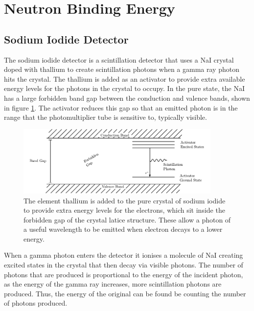 
\section{Neutron Binding Energy} %
\label{sec:neutron_binding_energy}

\subsection{Sodium Iodide Detector} %
\label{ssub:sodium_iodide_detector}
The sodium iodide detector is a scintillation detector that uses a NaI crystal doped with thallium to create scintillation photons when a gamma ray photon hits the crystal. The thallium is added as an activator to provide extra available energy levels for the photons in the crystal to occupy. In the pure state, the NaI has a large forbidden band gap between the conduction and valence bands, shown in figure \ref{fig:thaliumactivator}. The activator reduces this gap so that an emitted photon is in the range that the photomultiplier tube is sensitive to, typically visible.
\begin{figure}[ht]
	\centering
	\includegraphics[width=0.9\textwidth]{NaIbands.pdf}
	\caption{The element thallium is added to the pure crystal of sodium iodide to provide extra energy levels for the electrons, which sit inside the forbidden gap of the crystal latice structure. These allow a photon of a useful wavelength to be emitted when electron decays to a lower energy.\label{fig:thaliumactivator}}
\end{figure}

When a gamma photon enters the detector it ionises a molecule of NaI creating excited states in the crystal that then decay via visible photons. The number of photons that are produced is proportional to the energy of the incident photon, as the energy of the gamma ray increases, more scintillation photons are produced. Thus, the energy of the original can be found be counting the number of photons produced. 

